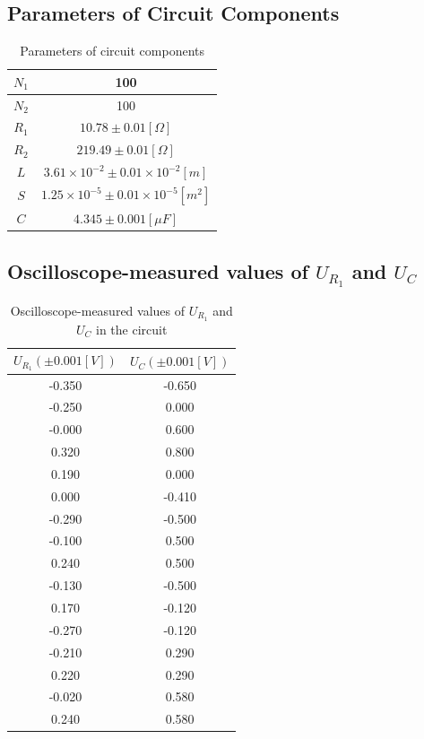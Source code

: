 \documentclass[12pt]{article}
\begin{document}
\subsection{Parameters of Circuit Components}
\begin{table}[H]
\centering
\begin{tabular}{|c|c|}
\hline
$N_1$ &100  \\ \hline
$N_2$ &100  \\ \hline
$R_1$ &$10.78\pm 0.01[\Omega]$  \\ \hline
$R_2$ &$219.49\pm 0.01[\Omega]$  \\ \hline
$L$ &$3.61\times10^{-2}\pm0.01\times10^{-2}[m]$  \\ \hline
$S$&$1.25\times10^{-5}\pm0.01\times10^{-5}[m^2]$  \\ \hline
$C$&$4.345\pm0.001[\mu F]$  \\ \hline
\end{tabular}
\caption{Parameters of circuit components}
\end{table}
\subsection{Oscilloscope-measured values of $U_{R_1}$ and $U_C$}
\begin{table}[H]
\centering
\begin{tabular}{|c|c|}
\hline
$U_{R_1}(\pm 0.001[V])$ &$U_C(\pm 0.001[V])$  \\ \hline
-0.350 &-0.650  \\ \hline
-0.250 &0.000  \\ \hline
-0.000 &0.600  \\ \hline
0.320 &0.800  \\ \hline
0.190 &0.000  \\ \hline
0.000 &-0.410  \\ \hline
-0.290 &-0.500  \\ \hline
-0.100 &0.500  \\ \hline
0.240 &0.500  \\ \hline
-0.130 &-0.500  \\ \hline
0.170 &-0.120  \\ \hline
-0.270 &-0.120  \\ \hline
-0.210 &0.290  \\ \hline
0.220 &0.290  \\ \hline
-0.020 &0.580  \\ \hline
0.240 &0.580  \\ \hline
\end{tabular}
\caption{Oscilloscope-measured values of $U_{R_1}$ and $U_C$ in the circuit}
\end{table}
\end{document}
